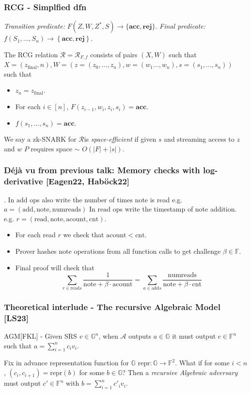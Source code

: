 \documentclass[shadesubsections,compress,14pt,mathserif]{beamer}
\newcommand{\adv}{\ensuremath{\mathcal A}}
\newcommand{\F}{\ensuremath{{\mathbb F}}}
\newcommand{\G}{\ensuremath{{\mathbb G}}}
\newcommand{\set}[1]{\ensuremath{\left\{#1\right\}}}
\newcommand{\acc}{{\mathbf{acc}}}
\newcommand{\rej}{{\mathbf{rej}}}
\newcommand{\zfin}{\ensuremath{z_{\mathrm{final}}}}
\newcommand{\rel}{\ensuremath{\mathcal{R}}}
\newcommand{\repr}{\ensuremath{\mathrm{repr} }}
\newcommand{\numreads}{\ensuremath{\mathrm{numreads} }}
\newcommand{\add}{\ensuremath{\mathrm{add} }}
\newcommand{\adds}{\ensuremath{\mathrm{add}s }}
\newcommand{\cnt}{\ensuremath{\mathrm{cnt} }}
\newcommand{\addcount}{\ensuremath{\mathrm{acount} }}
\renewcommand{\read}{\ensuremath{\mathrm{read} }}
\newcommand{\reads}{\ensuremath{\mathrm{read}s }}
\renewcommand{\note}{\ensuremath{\mathrm{note} }}
\begin{document}
\begin{frame}
 \frametitle{RCG - Simplfied dfn}
\noindent
\emph{Transition predicate:} $F(Z,W,Z^*,S)\to \{\acc,\rej\}$. 
\emph{Final predicate:} $f(S_1,\ldots,S_n)\to \set{\acc,\rej}$.

The RCG relation $\rel=\rel_{F,f}$ consists of pairs $(X,W)$ such that
$X=(\zfin,n),W=(z=(z_0,\ldots,z_n),w=(w_1\ldots,w_n),s=(s_1,\ldots,s_n))$ such that
\begin{itemize}
 \item $z_n=\zfin$.
 \item For each $i\in [n]$, $F(z_{i-1},w_i,z_i,s_i)=\acc$.
 \item $f(s_1,\ldots,s_n)=\acc$.
\end{itemize}


We say a zk-SNARK for \rel is \emph{space-efficient} if given $s$ and streaming access
to $z$ and $w$ $P$ requires space $\sim$ $O(|F|+|s|)$.
\end{frame}
\begin{frame}
\frametitle{ D\'ej\`a vu from previous talk: Memory checks with log-derivative {\small [Eagen22, Hab{\"{o}}ck}22]}.
In $\add$ ops also write the number of times note is read
e.g. $a=(\add,\note,\numreads)$
In $\read$ ops write the timestamp of note addition.
e.g. $r=(\read,\note,\addcount,\cnt)$.

\begin{itemize}
 \item For each read $r$ we check that $\addcount<\cnt$.
 \item Prover hashes note operations from all function calls to get challenge $\beta\in \F$.
 \item Final proof will check that
 \[\sum_{r\in \reads} \frac{1}{\note + \beta \cdot \addcount} = \sum _{a\in \adds}\frac{\numreads}{\note+\beta \cdot \cnt} \]
\end{itemize}

\end{frame}
\begin{frame}
 \frametitle{Theoretical interlude - The recursive Algebraic Model [LS23]}
 AGM[FKL] - Given SRS $v\in \G^n$,
 when $\adv$ outputs $a\in \G$ it must output
 $c\in \F^n$ such that $a=\sum_{i=1}^n c_i v_i$.
 
 Fix in advance representation function for $\G$
 $\repr:\G\to \F^2$.
 What if for some $i<n$, $(c_i,c_{i+1}) = \repr(b)$ for some $b\in \G$?
 Then a \emph{recursive Algebraic adversary} must output $c'\in \F^n$ with
 $b=\sum_{i=1}^n c'_i v_i$.
\end{frame}
\end{document}
